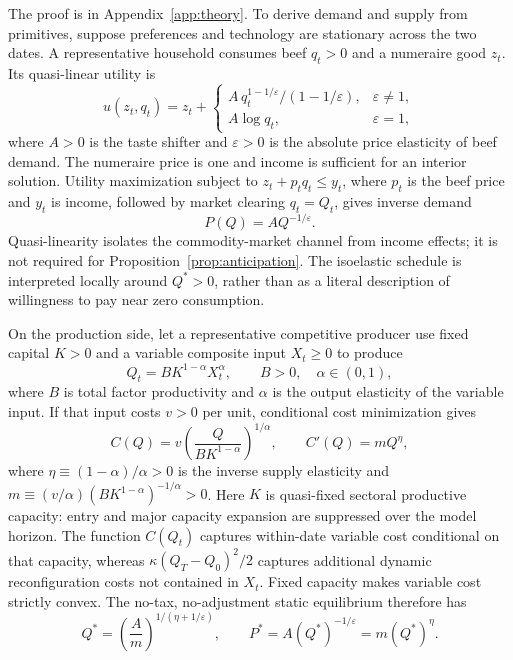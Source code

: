 \documentclass[11pt]{article}
\begin{document}
The proof is in Appendix~\ref{app:theory}. To derive demand and supply from primitives, suppose preferences and technology are stationary across the two dates. A representative household consumes beef $q_t>0$ and a numeraire good $z_t$. Its quasi-linear utility is
\begin{equation}\label{eq:utility}
u(z_t,q_t)=z_t+
\begin{cases}
A\,q_t^{1-1/\varepsilon}/(1-1/\varepsilon),&\varepsilon\neq1,\\
A\log q_t,&\varepsilon=1,
\end{cases}
\end{equation}
where $A>0$ is the taste shifter and $\varepsilon>0$ is the absolute price elasticity of beef demand. The numeraire price is one and income is sufficient for an interior solution. Utility maximization subject to $z_t+p_tq_t\leq y_t$, where $p_t$ is the beef price and $y_t$ is income, followed by market clearing $q_t=Q_t$, gives inverse demand
\begin{equation}\label{eq:isoelastic_demand}
P(Q)=A Q^{-1/\varepsilon}.
\end{equation}
Quasi-linearity isolates the commodity-market channel from income effects; it is not required for Proposition~\ref{prop:anticipation}. The isoelastic schedule is interpreted locally around $Q^*>0$, rather than as a literal description of willingness to pay near zero consumption.

On the production side, let a representative competitive producer use fixed capital $K>0$ and a variable composite input $X_t\geq0$ to produce
\begin{equation}\label{eq:cobb_douglas}
Q_t=B K^{1-\alpha}X_t^{\alpha},
\qquad B>0,\quad \alpha\in(0,1),
\end{equation}
where $B$ is total factor productivity and $\alpha$ is the output elasticity of the variable input. If that input costs $v>0$ per unit, conditional cost minimization gives
\begin{equation}\label{eq:micro_cost}
C(Q)=v\left(\frac{Q}{BK^{1-\alpha}}\right)^{1/\alpha},
\qquad C'(Q)=mQ^{\eta},
\end{equation}
where $\eta\equiv(1-\alpha)/\alpha>0$ is the inverse supply elasticity and $m\equiv(v/\alpha)(BK^{1-\alpha})^{-1/\alpha}>0$. Here $K$ is quasi-fixed sectoral productive capacity: entry and major capacity expansion are suppressed over the model horizon. The function $C(Q_t)$ captures within-date variable cost conditional on that capacity, whereas $\kappa(Q_T-Q_0)^2/2$ captures additional dynamic reconfiguration costs not contained in $X_t$. Fixed capacity makes variable cost strictly convex. The no-tax, no-adjustment static equilibrium therefore has
\begin{equation}\label{eq:baseline_equilibrium}
Q^*=\left(\frac{A}{m}\right)^{1/(\eta+1/\varepsilon)},
\qquad P^*=A(Q^*)^{-1/\varepsilon}=m(Q^*)^{\eta}.
\end{equation}
\end{document}
